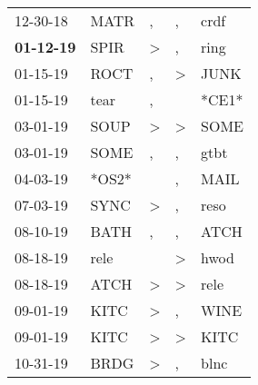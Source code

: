 \begin{supertabular}{p{0.07\textwidth}p{0.06\textwidth}p{0.02\textwidth}p{0.02\textwidth}p{0.06\textwidth}}
          12-30-18\textsuperscript{} &           MATR\textsuperscript{} &                , &                , &           crdf\textsuperscript{} \\
 \textbf{01-12-19\textsuperscript{}} &           SPIR\textsuperscript{} &     \textgreater &                , &           ring\textsuperscript{} \\
          01-15-19\textsuperscript{} &           ROCT\textsuperscript{} &                , &     \textgreater &           JUNK\textsuperscript{} \\
          01-15-19\textsuperscript{} &           tear\textsuperscript{} &                , &                  &                            *CE1* \\
          03-01-19\textsuperscript{} &           SOUP\textsuperscript{} &     \textgreater &     \textgreater &           SOME\textsuperscript{} \\
          03-01-19\textsuperscript{} &           SOME\textsuperscript{} &                , &                , &           gtbt\textsuperscript{} \\
          04-03-19\textsuperscript{} &                            *OS2* &                  &                , &           MAIL\textsuperscript{} \\
          07-03-19\textsuperscript{} &           SYNC\textsuperscript{} &     \textgreater &                , &           reso\textsuperscript{} \\
          08-10-19\textsuperscript{} &           BATH\textsuperscript{} &                , &                , &           ATCH\textsuperscript{} \\
          08-18-19\textsuperscript{} &           rele\textsuperscript{} &                  &     \textgreater &           hwod\textsuperscript{} \\
          08-18-19\textsuperscript{} &           ATCH\textsuperscript{} &     \textgreater &     \textgreater &           rele\textsuperscript{} \\
          09-01-19\textsuperscript{} &           KITC\textsuperscript{} &     \textgreater &                , &           WINE\textsuperscript{} \\
          09-01-19\textsuperscript{} &           KITC\textsuperscript{} &     \textgreater &     \textgreater &           KITC\textsuperscript{} \\
          10-31-19\textsuperscript{} &           BRDG\textsuperscript{} &     \textgreater &                , &           blnc\textsuperscript{} \\

\end{supertabular}
